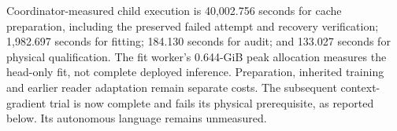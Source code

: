Coordinator-measured child execution is 40,002.756 seconds for cache preparation,
including the preserved failed attempt and recovery verification; 1,982.697
seconds for fitting; 184.130 seconds for audit; and 133.027 seconds for physical
qualification. The fit worker's 0.644-GiB peak allocation measures the head-only
fit, not complete deployed inference. Preparation, inherited training and
earlier reader adaptation remain separate costs. The subsequent context-gradient
trial is now complete and fails its physical prerequisite, as reported below.
Its autonomous language remains unmeasured.
